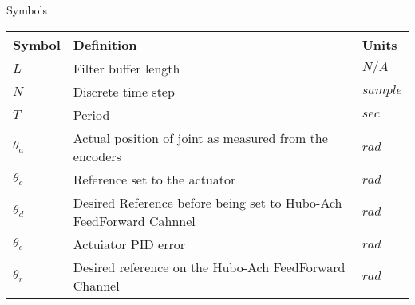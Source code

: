 \Large
\centering
Symbols\\
\normalsize
\begin{tabular}{l | l | l}
\hline
Symbol     & Definition                                                         & Units \\
\hline
$L$        & Filter buffer length                                               & $N/A$\\
\hline
$N$        & Discrete time step                                                 & $sample$\\
\hline
$T$        & Period                                                             & $sec$ \\
\hline
$\theta_a$ & Actual position of joint as measured from the encoders             & $rad$ \\
\hline
$\theta_c$ & Reference set to the actuator                                      & $rad$ \\
\hline
$\theta_d$ & Desired Reference before being set to Hubo-Ach FeedForward Cahnnel & $rad$ \\
\hline
$\theta_e$ & Actuiator PID error                                                & $rad$ \\
\hline
$\theta_r$ & Desired reference on the Hubo-Ach FeedForward Channel              & $rad$ \\
\hline

\end{tabular}
